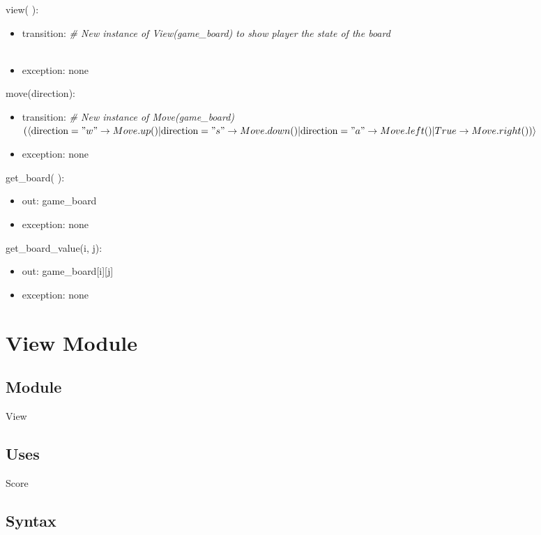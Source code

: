 \documentclass[12pt]{article}
\begin{document}
\noindent view( ):
\begin{itemize}
\item transition: \textit{\# New instance of View(game\_board) to show player the state of the board}~\\\
\item exception: none
\end{itemize}

\noindent move(direction):
\begin{itemize}
\item transition: \textit{\# New instance of Move(game\_board)}~\\

$(\langle \text{direction} = "w" \rightarrow Move.up() | \text{direction} = "s" \rightarrow Move.down() | \text{direction} = "a" \rightarrow Move.left() | True \rightarrow Move.right()) \rangle$

\item exception: none
\end{itemize}

\noindent get\_board( ):
\begin{itemize}
\item out: game\_board
\item exception: none
\end{itemize}

\noindent get\_board\_value(i, j):
\begin{itemize}
\item out: game\_board[i][j]
\item exception: none
\end{itemize}

\newpage

\section* {View Module}

\subsection* {Module}

View

\subsection* {Uses}

Score

\subsection* {Syntax}
\end{document}
